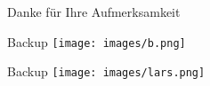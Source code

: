 
\begin{frame}
    Danke für Ihre Aufmerksamkeit
\end{frame}


\begin{frame}{Backup}
    \centering
    \texttt{[image: images/b.png]}\\[-0.5\baselineskip]
\end{frame}

\begin{frame}{Backup}
    \centering
    \texttt{[image: images/lars.png]}\\[-0.5\baselineskip]
\end{frame}